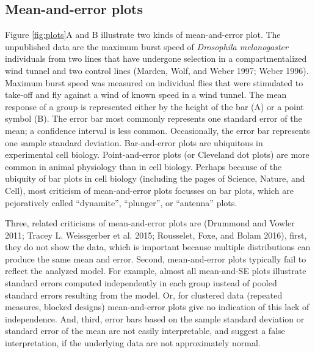 \documentclass[]{article}
\theoremstyle{definition}
\theoremstyle{definition}
\theoremstyle{definition}
\theoremstyle{remark}
\begin{document}
\subsection*{Mean-and-error plots}\label{mean-and-error-plots}

Figure \ref{fig:plots}A and B illustrate two kinds of mean-and-error
plot. The unpublished data are the maximum burst speed of
\emph{Drosophila melanogaster} individuals from two lines that have
undergone selection in a compartmentalized wind tunnel and two control
lines (Marden, Wolf, and Weber 1997; Weber 1996). Maximum burst speed
was measured on individual flies that were stimulated to take-off and
fly against a wind of known speed in a wind tunnel. The mean response of
a group is represented either by the height of the bar (A) or a point
symbol (B). The error bar most commonly represents one standard error of
the mean; a confidence interval is less common. Occasionally, the error
bar represents one sample standard deviation. Bar-and-error plots are
ubiquitous in experimental cell biology. Point-and-error plots (or
Cleveland dot plots) are more common in animal physiology than in cell
biology. Perhaps because of the ubiquity of bar plots in cell biology
(including the pages of Science, Nature, and Cell), most criticism of
mean-and-error plots focusses on bar plots, which are pejoratively
called ``dynamite'', ``plunger'', or ``antenna'' plots.

Three, related criticisms of mean-and-error plots are (Drummond and
Vowler 2011; Tracey L. Weissgerber et al. 2015; Rousselet, Foxe, and
Bolam 2016), first, they do not show the data, which is important
because multiple distributions can produce the same mean and error.
Second, mean-and-error plots typically fail to reflect the analyzed
model. For example, almost all mean-and-SE plots illustrate standard
errors computed independently in each group instead of pooled standard
errors resulting from the model. Or, for clustered data (repeated
measures, blocked designs) mean-and-error plots give no indication of
this lack of independence. And, third, error bars based on the sample
standard deviation or standard error of the mean are not easily
interpretable, and suggest a false interpretation, if the underlying
data are not approximately normal.
\end{document}
